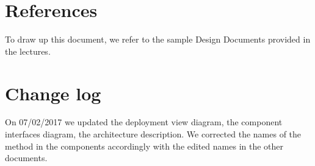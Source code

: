 \documentclass{scrreprt}
\begin{document}
\chapter{References}
To draw up this document, we refer to the sample Design Documents provided in the lectures.
\chapter{Change log}
On 07/02/2017 we updated the deployment view diagram, the component interfaces diagram, the architecture description. We corrected the names of the method in the components accordingly with the edited names in the other documents.
\end{document}
